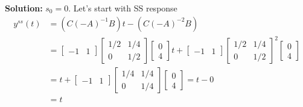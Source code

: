 \documentclass[twoside]{article}
\begin{document}
\textbf{Solution:} $s_0 = 0$. Let's start with SS response 
%
\begin{align*} 
y^{ss}(t) &= \left( C \left(- A \right)^{-1} B \right) t  - \left( C \left(- A \right)^{-2} B \right) 
\\ &=  \begin{bmatrix} -1 & 1 \end{bmatrix}  \begin{bmatrix} 1/2 & 1/4 \\ 0 & 1/2 \end{bmatrix}  \begin{bmatrix} 0 \\ 4 \end{bmatrix} t 
+  \begin{bmatrix} -1 & 1 \end{bmatrix}  \begin{bmatrix} 1/2 & 1/4 \\ 0 & 1/2 \end{bmatrix}^2  \begin{bmatrix} 0 \\ 4 \end{bmatrix}
\\ &= t + \begin{bmatrix} -1 & 1 \end{bmatrix}  \begin{bmatrix} 1/4 & 1/4 \\ 0 & 1/4 \end{bmatrix}  \begin{bmatrix} 0 \\ 4 \end{bmatrix} = t - 0
\\ &= t
\end{align*}
\end{document}
